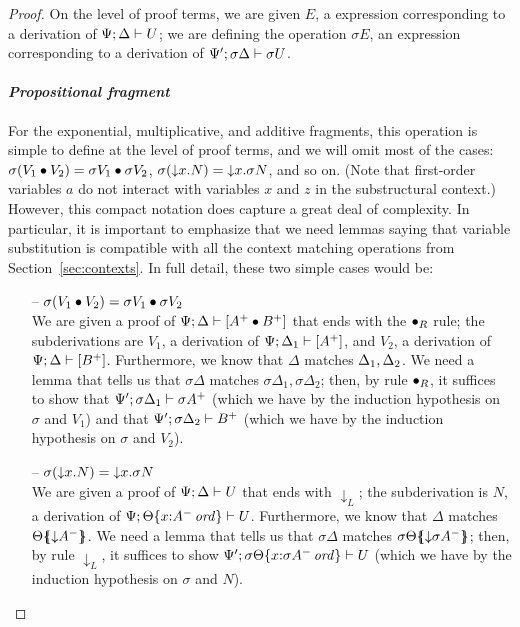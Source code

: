 \begin{proof}
On the level of proof terms, 
we are given $E$, a expression corresponding to a derivation of
${\Psi};{\Delta} \vdash {U}$; we are defining the operation $\sigma{E}$,
an expression corresponding to a derivation of 
${\Psi'};{\sigma\Delta} \vdash {\sigma{U}}$.

\paragraph{\it Propositional fragment}
For the exponential, multiplicative, and additive fragments, this
operation is simple to define at the level of proof terms, and we will
omit most of the cases: $\sigma({V_1} \mathbin{\bullet} {V_2}) =
{\sigma{V_1}} \mathbin{\bullet} {\sigma{V_2}}$, $\sigma({\downarrow}{x}.{N}) =
{\downarrow}{x}.{\sigma N}$, and so on. (Note that first-order variables
$a$ do not interact with variables $x$ and $z$ in the substructural
context.) However, this compact notation does
capture a great deal of complexity. In particular, it is important to
emphasize that we need lemmas saying that variable substitution is
compatible with all the context matching operations from
Section~\ref{sec:contexts}.  In full detail, these two simple cases
would be:

\begin{itemize}

\item[--]
$\sigma({V_1} \mathbin{\bullet} {V_2}) = {\sigma{V_1}} \mathbin{\bullet} {\sigma{V_2}}$\smallskip\\
We are given a proof of ${\Psi};{\Delta} \vdash {[A^+ \mathbin{\bullet}B^+]}$ that
ends with the ${\mathbin{\bullet}}_R$ rule; the subderivations are
$V_1$, a derivation of ${\Psi};{\Delta_1} \vdash {[A^+]}$, and
$V_2$, a derivation of ${\Psi};{\Delta} \vdash {[B^+]}$. Furthermore, we know that
$\Delta$ matches ${\Delta_1},{\Delta_2}$. We need a lemma that
tells us that $\sigma\Delta$ matches $\sigma\Delta_1, \sigma\Delta_2$;
then, by rule ${\mathbin{\bullet}}_R$, it suffices to show that
${\Psi'};{\sigma\Delta_1} \vdash {\sigma{A^+}}$ (which we have by the 
induction hypothesis on $\sigma$ and $V_1$) and that
${\Psi'};{\sigma\Delta_2} \vdash {B^+}$ (which we have by the induction hypothesis
on $\sigma$ and $V_2$). \smallskip

\item[--]
$\sigma({\downarrow}{x}.{N}) = {\downarrow}{x}.{\sigma N}$ \smallskip\\ 
We are given a proof
of ${\Psi};{\Delta} \vdash {U}$ that ends with ${\downarrow}_L$; 
the subderivation is $N$, a derivation of
${\Psi};{{\Theta}\{{x{:}{A^-}\,{{\it ord}}}\}} \vdash {U}$. Furthermore, we know that
$\Delta$ matches ${\Theta}\mbox{$\{\hspace{-4pt}\{$}{{\downarrow}A^-}\mbox{$\}\hspace{-4pt}\}$}$. We need a lemma
that tells us that $\sigma\Delta$ matches
${\sigma\Theta}\mbox{$\{\hspace{-4pt}\{$}{{\downarrow}\sigma A^-}\mbox{$\}\hspace{-4pt}\}$}$; then, by 
rule ${\downarrow}_L$, it suffices to show 
${\Psi'};{{\sigma\Theta}\{{x{:}{\sigma{A^-}}\,{{\it ord}}}\}} \vdash {U}$ (which
we have by the induction hypothesis on $\sigma$ and $N$).


\end{itemize}
\end{proof}
